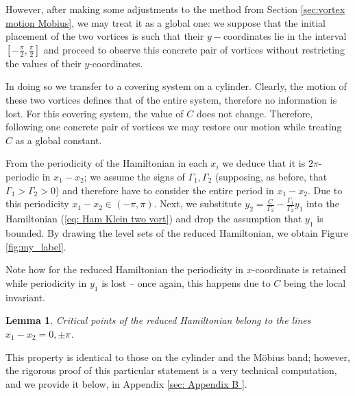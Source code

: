 \documentclass[11pt,twoside]{article}
\newtheorem{lem}[theorem]{Lemma}
\theoremstyle{definition}
\numberwithin{equation}{section}
\begin{document}
However, after making some adjustments to the method from Section \ref{sec:vortex motion Mobius}, we may treat it as a global one: we suppose that the initial placement of the two vortices is such that their $y-$coordinates lie in the interval $\left[-\frac{\pi}{2},\frac{\pi}{2}\right]$ and proceed to observe this concrete pair of vortices without restricting the values of their $y$-coordinates.

In doing so we transfer to a covering system on a cylinder. Clearly, the motion of these two vortices defines that of the entire system, therefore no information is lost.   For this covering  system, the value of  $C$ does not change. Therefore,  following one concrete pair of vortices we may restore our motion while  treating $C$ as a global constant. 
 
 
 From the periodicity of the Hamiltonian in each $x_i$ we deduce that it is $2\pi$-periodic in $x_1-x_2$; we assume the signs of $\Gamma_1,\Gamma_2$ (supposing, as before, that $\Gamma_1>\Gamma_2>0$) and therefore have to consider the entire period in $x_1-x_2$. Due to this periodicity $x_1-x_2\in (-\pi,\pi)$. Next, we substitute $y_2 = \frac{C}{\Gamma_2} - \frac{\Gamma_1}{\Gamma_2}y_1$ into the Hamiltonian (\ref{eq: Ham Klein two vort}) and drop the assumption that $y_1$ is bounded.  By drawing the level sets of the reduced Hamiltonian, we obtain Figure \ref{fig:my_label}.
 
 
 Note how for the reduced Hamiltonian the  periodicity in $x$-coordinate is retained while  periodicity in $y_1$ is lost -- once again, this happens due to $C$ being the local invariant.
 
  
\begin{lem}
\label{st: lemma crit points of the Hamiltonian Klein}
Critical points of the  reduced Hamiltonian  belong to the lines $x_1-x_2 = 0,\pm \pi$. 
\end{lem}

This property is identical to those on the cylinder and the M\"obius band;  however, the rigorous proof of this particular statement is a very technical computation, and we provide it below, in Appendix \ref{sec: Appendix B }. 
\end{document}
